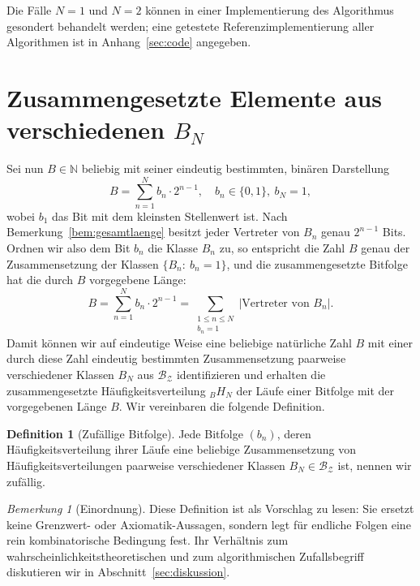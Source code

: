 \documentclass[11pt,a4paper]{scrartcl}
\theoremstyle{plain}
\theoremstyle{definition}
\newtheorem{defi}[satz]{Definition}
\theoremstyle{remark}
\newtheorem{bem}[satz]{Bemerkung}
\begin{document}
Die Fälle $N=1$ und $N=2$ können in einer Implementierung des
Algorithmus gesondert behandelt werden; eine getestete
Referenzimplementierung aller Algorithmen ist in
Anhang~\ref{sec:code} angegeben.

\section{Zusammengesetzte Elemente aus verschiedenen
\texorpdfstring{$B_N$}{B\_N}}\label{sec:zusammengesetzt}

Sei nun $B\in\mathbb N$ beliebig mit seiner eindeutig bestimmten,
binären Darstellung
\begin{equation}\label{eqn:bindarstellung}
  B = \sum_{n=1}^{N} b_n\cdot 2^{n-1},\quad b_n\in\{0,1\},\ b_N=1,
\end{equation}
wobei $b_1$ das Bit mit dem kleinsten Stellenwert ist. Nach
Bemerkung~\ref{bem:gesamtlaenge} besitzt jeder Vertreter von $B_n$
genau $2^{n-1}$ Bits. Ordnen wir also dem Bit $b_n$ die Klasse $B_n$ zu,
so entspricht die Zahl $B$ genau der Zusammensetzung der Klassen
$\{B_n:\ b_n=1\}$, und die zusammengesetzte Bitfolge hat die durch $B$
vorgegebene Länge:
\begin{equation}\label{eqn:bsummelaufehaeufigkeit}
  B = \sum_{n=1}^{N} b_n\cdot 2^{n-1}
  = \sum_{\substack{1\leq n\leq N\\ b_n=1}}
  \left|\text{Vertreter von } B_n\right|.
\end{equation}
Damit können wir auf eindeutige Weise eine beliebige natürliche Zahl
$B$ mit einer durch diese Zahl eindeutig bestimmten Zusammensetzung
paarweise verschiedener Klassen $B_N$ aus $\mathcal{B_Z}$ identifizieren und erhalten die zusammengesetzte
Häufigkeitsverteilung $_BH_N$ der Läufe einer Bitfolge mit der
vorgegebenen Länge $B$. Wir vereinbaren die folgende Definition.

\begin{defi}[Zufällige Bitfolge]\label{defi:zufaellig}
Jede Bitfolge $(b_n)$, deren Häufigkeitsverteilung ihrer Läufe eine
beliebige Zusammensetzung von Häufigkeitsverteilungen paarweise
verschiedener Klassen $B_N \in \mathcal{B_Z}$ ist, nennen wir
zufällig.
\end{defi}
\begin{bem}[Einordnung]\label{bem:einordnung}
Diese Definition ist als Vorschlag zu lesen: Sie ersetzt keine
Grenzwert- oder Axiomatik-Aussagen, sondern legt für endliche Folgen
eine rein kombinatorische Bedingung fest. Ihr Verhältnis zum
wahrscheinlichkeitstheoretischen und zum algorithmischen
Zufallsbegriff diskutieren wir in Abschnitt~\ref{sec:diskussion}.
\end{bem}
\end{document}
